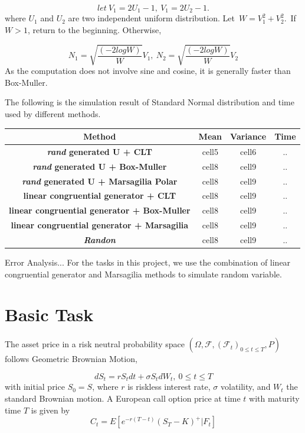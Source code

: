 \documentclass[12pt,a4paper,fleqn]{article}
\begin{document}
$$ let \ V_1 = 2U_1-1,\  V_1 = 2U_2-1.$$
where $U_1$ and $U_2$ are two independent uniform distribution.
 Let\ $W = V_1^2+V_2^2.$\ If $W>1$, return to the beginning. Otherwise,

$$N_1 = \sqrt{\frac{(-2logW)}{W}}V_1,\ N_2 = \sqrt{\frac{(-2logW)}{W}}V_2$$As the computation does not involve sine and cosine, it is generally faster than Box-Muller.

The following is the simulation result of Standard Normal distribution and time used by different methods.
\begin{center}
\begin{tabular}{| c| c| c| c| }
\hline
\textbf{ Method} &\textbf{ Mean} & \textbf{Variance}&\textbf{ Time} \\ \hline
\textbf{\textit{ rand} generated U + CLT} & cell5 & cell6&.. \\  \hline
\textbf{\textit{ rand} generated U + Box-Muller} & cell8 & cell9&..\\ \hline
\textbf{\textit{ rand} generated U + Marsagilia Polar} & cell8 & cell9&..\\ \hline
\textbf{ linear congruential generator + CLT} & cell8 & cell9&..\\ \hline
\textbf{linear congruential generator + Box-Muller} & cell8 & cell9&..\\ \hline
\textbf{ linear congruential generator + Marsagilia} & cell8 & cell9&..\\ \hline
\textbf{\textit{Randon} }& cell8 & cell9&..\\ \hline

\end{tabular}
\end{center}

Error Analysis...
For the tasks in this project, we use the combination of linear congruential generator and Marsagilia methods to simulate random variable.

\section{Basic Task}


The asset price in a risk neutral probability space $(\Omega, \mathcal{F}, (\mathcal{F}_t)_{0\leq t\leq T}, P)$ follows Geometric Brownian Motion,

$$dS_t=rS_tdt+\sigma S_tdW_t, \ 0\leq t \leq T$$
with initial price $S_0 = S$, where $r$ is riskless interest rate, $\sigma$ volatility, and $W_t$ the standard Brownian motion. A European call option price at time $t$ with maturity time $T$ is given by
$$C_t = E[e^{-r(T-t)}(S_T-K)^+|\textit{F}_t]$$
\end{document}
